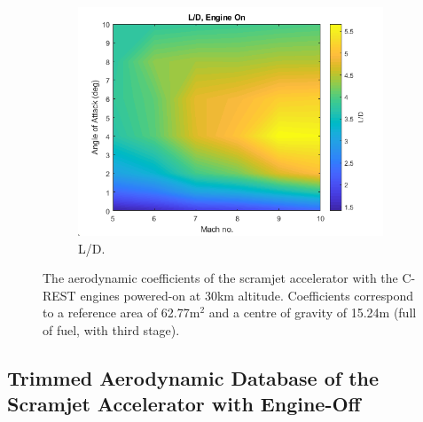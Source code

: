 \begin{figure}[ht]
\begin{subfigure}{.5\textwidth}
				\includegraphics[width=0.99\linewidth]{figures/3_vehicle_design/LD-EngineOn}
				\caption{L/D.}
				\label{fig:LD-EngineOn}
			\end{subfigure}
			\caption{The aerodynamic coefficients of the scramjet accelerator with the C-REST engines powered-on at 30km altitude. Coefficients correspond to a reference area of 62.77m$^2$ and a centre of gravity of 15.24m (full of fuel, with third stage). }%
			\label{fig:EngineOnAero}
		\end{figure}
		
		

\subsection{Trimmed Aerodynamic Database of the Scramjet Accelerator with Engine-Off}\label{sec:trimmedongineoff}

